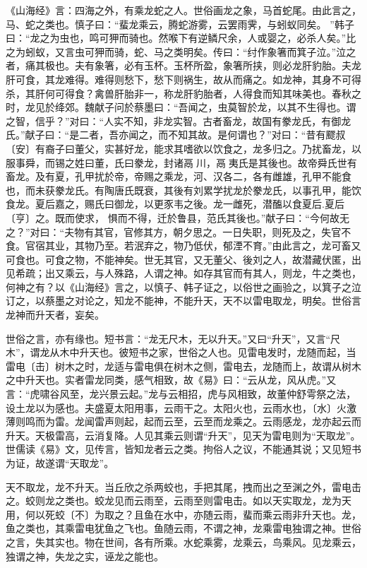 \documentclass[]{article}
\begin{document}
《山海经》言：四海之外，有乘龙蛇之人。世俗画龙之象，马首蛇尾。由此言之，马、蛇之类也。慎子曰：``蜚龙乘云，腾蛇游雾，云罢雨霁，与蚓蚁同矣。
''韩子曰：``龙之为虫也，鸣可狎而骑也。然喉下有逆鳞尺余，人或婴之，必杀人矣。''比之为蚓蚁，又言虫可狎而骑，蛇、马之类明矣。传曰：``纣作象箸而箕子泣。''泣之者，痛其极也。夫有象箸，必有玉杯。玉杯所盈，象箸所挟，则必龙肝豹胎。夫龙肝可食，其龙难得。难得则愁下，愁下则祸生，故从而痛之。如龙神，其身不可得杀，其肝何可得食？禽兽肝胎非一，称龙肝豹胎者，人得食而知其味美也。春秋之时，龙见於绛郊。魏献子问於蔡墨曰：``吾闻之，虫莫智於龙，以其不生得也。谓之智，信乎？''对曰：``人实不知，非龙实智。古者畜龙，故国有豢龙氏，有御龙氏。''献子曰：``是二者，吾亦闻之，而不知其故。是何谓也？''对曰：``昔有飂叔〔安〕有裔子曰董父，实甚好龙，能求其嗜欲以饮食之，龙多归之。乃扰畜龙，以服事舜，而锡之姓曰董，氏曰豢龙，封诸鬲川，鬲夷氏是其後也。故帝舜氏世有畜龙。及有夏，孔甲扰於帝，帝赐之乘龙，河、汉各二，各有雌雄，孔甲不能食也，而未获豢龙氏。有陶唐氏既衰，其後有刘累学扰龙於豢龙氏，以事孔甲，能饮食龙。夏后嘉之，赐氏曰御龙，以更豕韦之後。龙一雌死，潜醢以食夏后.夏后〔亨〕之。既而使求，
惧而不得，迁於鲁县，范氏其後也。''献子曰：``今何故无之？''对曰：``夫物有其官，官修其方，朝夕思之。一日失职，则死及之，失官不食。官宿其业，其物乃至。若泯弃之，物乃低伏，郁湮不育。''由此言之，龙可畜又可食也。可食之物，不能神矣。世无其官，又无董父、後刘之人，故潜藏伏匿，出见希疏；出又乘云，与人殊路，人谓之神。如存其官而有其人，则龙，牛之类也，何神之有？以《山海经》言之，以慎子、韩子证之，以俗世之画验之，以箕子之泣订之，以蔡墨之对论之，知龙不能神，不能升天，天不以雷电取龙，明矣。世俗言龙神而升天者，妄矣。

世俗之言，亦有缘也。短书言：``龙无尺木，无以升天。''又曰``升天''，又言``尺木''，谓龙从木中升天也。彼短书之家，世俗之人也。见雷电发时，龙随而起，当雷电〔击〕树木之时，龙适与雷电俱在树木之侧，雷电去，龙随而上，故谓从树木之中升天也。实者雷龙同类，感气相致，故《易》曰：``云从龙，风从虎。''又言：``虎啸谷风至，龙兴景云起。''龙与云相招，虎与风相致，故董仲舒雩祭之法，设土龙以为感也。夫盛夏太阳用事，云雨干之。太阳火也，云雨水也，〔水〕火激薄则鸣而为雷。龙闻雷声则起，起而云至，云至而龙乘之。云雨感龙，龙亦起云而升天。天极雷高，云消复降。人见其乘云则谓``升天''，见天为雷电则为``天取龙''。世儒读《易》文，见传言，皆知龙者云之类。拘俗人之议，不能通其说；又见短书为证，故遂谓``天取龙''。

天不取龙，龙不升天。当丘欣之杀两蛟也，手把其尾，拽而出之至渊之外，雷电击之。蛟则龙之类也。蛟龙见而云雨至，云雨至则雷电击。如以天实取龙，龙为天用，何以死蛟〔不〕为取之？且鱼在水中，亦随云雨，蜚而乘云雨非升天也。龙，鱼之类也，其乘雷电犹鱼之飞也。鱼随云雨，不谓之神，龙乘雷电独谓之神。世俗之言，失其实也。物在世间，各有所乘。水蛇乘雾，龙乘云，鸟乘风。见龙乘云，独谓之神，失龙之实，诬龙之能也。
\end{document}
